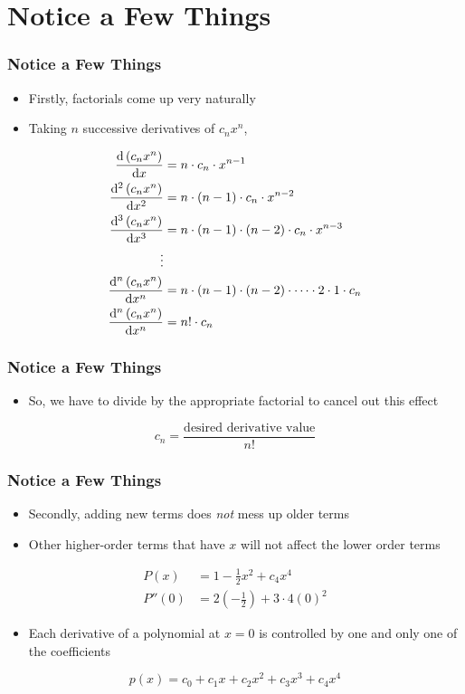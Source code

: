 \documentclass{beamer}
\begin{document}
\section{Notice a Few Things}

\begin{frame}
  \frametitle{Notice a Few Things}
  \begin{itemize}
    \item Firstly, factorials come up very naturally
    \item Taking \( n \) successive derivatives of \( c_nx^n \),
  \end{itemize}
  \begin{align*}
    \dv{\left(c_nx^n\right)}{x} &= n \cdot c_n \cdot x^{n - 1} \\
    \dv[2]{\left(c_nx^n\right)}{x} &= n \cdot (n - 1) \cdot c_n \cdot x^{n - 2} \\
    \dv[3]{\left(c_nx^n\right)}{x} &= n \cdot (n - 1) \cdot (n - 2) \cdot c_n \cdot x^{n - 3} \\
    \vdots \\
    \dv[n]{\left(c_nx^n\right)}{x} &= n \cdot (n - 1) \cdot (n - 2) \cdot \cdots \cdot 2 \cdot 1 \cdot c_n \\
    \dv[n]{\left(c_nx^n\right)}{x} &= n! \cdot c_n
  \end{align*}
\end{frame}

\begin{frame}
  \frametitle{Notice a Few Things}
  \begin{itemize}
    \item So, we have to divide by the appropriate factorial to cancel out this effect
  \end{itemize}
  \begin{equation*}
    c_n = \frac{\text{desired derivative value}}{n!}
  \end{equation*}
\end{frame}

\begin{frame}
  \frametitle{Notice a Few Things}
  \begin{itemize}
    \item Secondly, adding new terms does \textit{not} mess up older terms
    \item Other higher-order terms that have \( x \) will not affect the lower order terms
  \end{itemize}
  \begin{align*}
    P(x) & = 1 - \frac{1}{2}x^2 + c_4 x^4 \\
    P''(0) & = 2\left(-\frac{1}{2}\right) + 3 \cdot 4 (0)^2
  \end{align*}
  \begin{itemize}
    \item Each derivative of a polynomial at \( x = 0 \) is controlled by one and only one of the coefficients
  \end{itemize}
  \begin{equation*}
    p(x) = c_0 + c_1x + c_2x^2 + c_3x^3 + c_4x^4
  \end{equation*} %
\end{frame}
\end{document}
